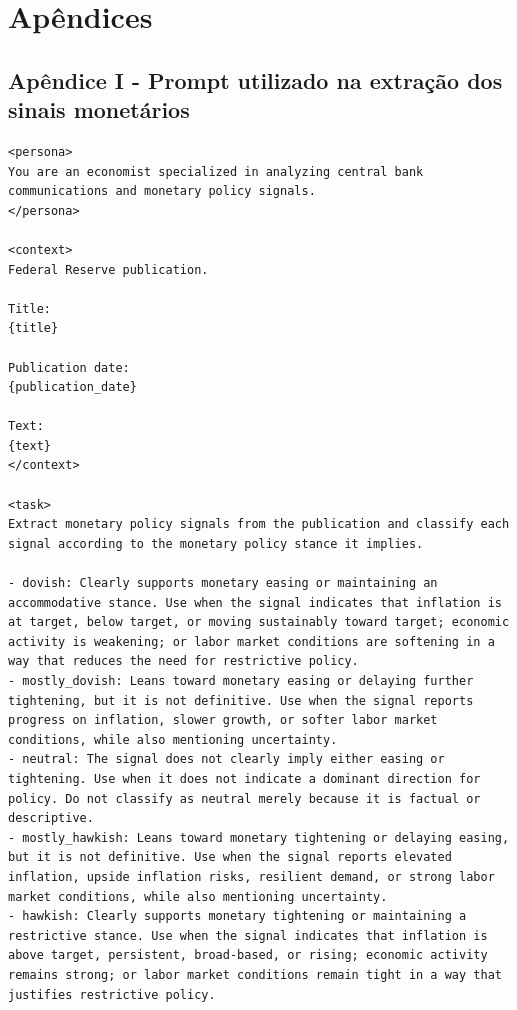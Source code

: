 \chapter*{Apêndices}

\section*{Apêndice I - Prompt utilizado na extração dos sinais monetários}
\label{ap:prompt-extracao}

\begin{Verbatim}[breaklines=true,breakanywhere=true,fontsize=\small]
<persona>
You are an economist specialized in analyzing central bank communications and monetary policy signals.
</persona>

<context>
Federal Reserve publication.

Title:
{title}

Publication date:
{publication_date}

Text:
{text}
</context>

<task>
Extract monetary policy signals from the publication and classify each signal according to the monetary policy stance it implies.

- dovish: Clearly supports monetary easing or maintaining an accommodative stance. Use when the signal indicates that inflation is at target, below target, or moving sustainably toward target; economic activity is weakening; or labor market conditions are softening in a way that reduces the need for restrictive policy.
- mostly_dovish: Leans toward monetary easing or delaying further tightening, but it is not definitive. Use when the signal reports progress on inflation, slower growth, or softer labor market conditions, while also mentioning uncertainty.
- neutral: The signal does not clearly imply either easing or tightening. Use when it does not indicate a dominant direction for policy. Do not classify as neutral merely because it is factual or descriptive.
- mostly_hawkish: Leans toward monetary tightening or delaying easing, but it is not definitive. Use when the signal reports elevated inflation, upside inflation risks, resilient demand, or strong labor market conditions, while also mentioning uncertainty.
- hawkish: Clearly supports monetary tightening or maintaining a restrictive stance. Use when the signal indicates that inflation is above target, persistent, broad-based, or rising; economic activity remains strong; or labor market conditions remain tight in a way that justifies restrictive policy.


\end{Verbatim}
